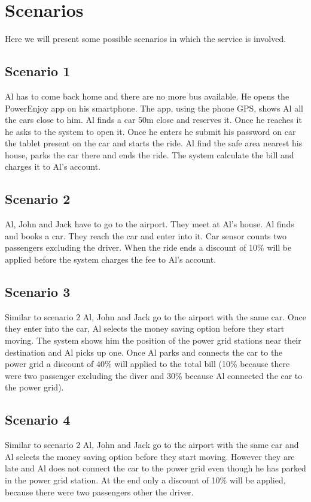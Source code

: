 \section{Scenarios}
Here we will present some possible scenarios in which the service is involved.
\subsection*{Scenario 1}
Al has to come back home and there are no more bus available. He opens the PowerEnjoy app on his smartphone. The app, using the phone GPS, shows Al all the cars close to him. Al finds a car 50m close and reserves it. Once he reaches it he asks to the system to open it. Once he enters he submit his password on car the tablet present on the car and starts the ride. Al find the safe area nearest his house, parks the car there and ends the ride. The system calculate the bill and charges it to Al's account.
\subsection*{Scenario 2}
Al, John and Jack have to go to the airport. They meet at Al's house. Al finds and books a car. They reach the car and enter into it. Car sensor counts two passengers excluding the driver. When the ride ends a discount of 10\% will be applied before the system charges the fee to Al's account.
\subsection*{Scenario 3}
Similar to scenario 2 Al, John and Jack go to the airport with the same car. Once they enter into the car, Al selects the money saving option before they start moving. The system shows him the position of the power grid stations near their destination and Al picks up one. Once Al parks and connects the car to the power grid a discount of 40\% will applied to the total bill (10\% because there were two passenger excluding the diver and 30\% because Al connected the car to the power grid).
\subsection*{Scenario 4}
Similar to scenario 2 Al, John and Jack go to the airport with the same car and Al selects the money saving option before they start moving. However they are late and Al does not connect the car to the power grid even though he has parked in the power grid station. At the end only a discount of 10\% will be applied, because there were two passengers other the driver.
